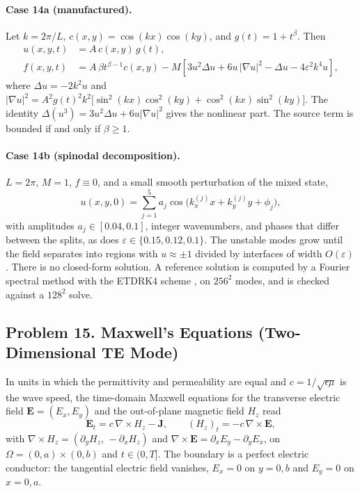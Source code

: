 \documentclass[11pt]{article}
\begin{document}
\paragraph{Case 14a (manufactured).}
Let $k=2\pi/L$, $c(x,y)=\cos(kx)\cos(ky)$, and $g(t)=1+t^\beta$. Then
\[
\begin{aligned}
u(x,y,t)&=A\,c(x,y)\,g(t),\\
f(x,y,t)&=A\,\beta t^{\beta-1}c(x,y)
-M\left[3u^2\Delta u+6u\,|\nabla u|^2-\Delta u-4\varepsilon^2k^4u\right],
\end{aligned}
\]
where $\Delta u=-2k^2u$ and
$|\nabla u|^2=A^2g(t)^2k^2\bigl[\sin^2(kx)\cos^2(ky)+\cos^2(kx)\sin^2(ky)\bigr]$.
The identity $\Delta(u^3)=3u^2\Delta u+6u|\nabla u|^2$ gives the
nonlinear part. The source term is bounded if and only if $\beta\ge1$.

\paragraph{Case 14b (spinodal decomposition).}
$L=2\pi$, $M=1$, $f\equiv0$, and a small smooth perturbation of the
mixed state,
\[
u(x,y,0)=\sum_{j=1}^{5}a_j\cos\bigl(k^{(j)}_xx+k^{(j)}_yy+\phi_j\bigr),
\]
with amplitudes $a_j\in[0.04,0.1]$, integer wavenumbers, and phases that
differ between the splits, as does $\varepsilon\in\{0.15,0.12,0.1\}$.
The unstable modes grow until the field separates into regions with
$u\approx\pm1$ divided by interfaces of width $O(\varepsilon)$. There is
no closed-form solution. A reference solution is computed by a Fourier
spectral method with the ETDRK4 scheme \cite{KT05}, on $256^2$ modes, and
is checked against a $128^2$ solve.

\subsection*{Problem 15. Maxwell's Equations (Two-Dimensional TE Mode)}

In units in which the permittivity and permeability are equal and
$c=1/\sqrt{\epsilon\mu}$ is the wave speed, the time-domain Maxwell
equations for the transverse electric field
$\mathbf{E}=(E_x,E_y)$ and the out-of-plane magnetic field $H_z$ read
\cite{Jac99,Yee66}
\[
\boxed{
\mathbf{E}_t=c\,\nabla\times H_z-\mathbf{J},
\qquad
(H_z)_t=-c\,\nabla\times\mathbf{E}
},
\]
with $\nabla\times H_z=(\partial_yH_z,\,-\partial_xH_z)$ and
$\nabla\times\mathbf{E}=\partial_xE_y-\partial_yE_x$, on
$\Omega=(0,a)\times(0,b)$ and $t\in(0,T]$. The boundary is a perfect
electric conductor: the tangential electric field vanishes,
$E_x=0$ on $y=0,b$ and $E_y=0$ on $x=0,a$.
\end{document}
